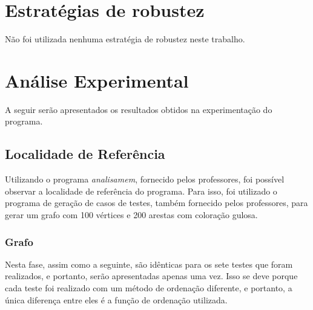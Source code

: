 \documentclass{article}
\begin{document}
\section{Estratégias de robustez}
Não foi utilizada nenhuma estratégia de robustez neste trabalho.

\section{Análise Experimental}

A seguir serão apresentados os resultados obtidos na experimentação do programa.

\subsection{Localidade de Referência}

Utilizando o programa \emph{analisamem}, fornecido pelos professores, foi possível observar a localidade de referência do programa. 
Para isso, foi utilizado o programa de geração de casos de testes, também fornecido pelos professores, para gerar um grafo com 100 vértices e 200 arestas com coloração gulosa.

\subsubsection{Grafo }
Nesta fase, assim como a seguinte, são idênticas para os sete testes que foram realizados, e portanto, serão apresentadas apenas uma vez. Isso se deve porque cada teste foi realizado com um método de ordenação diferente, e portanto, a única diferença entre eles é a função de ordenação utilizada.


\end{document}
